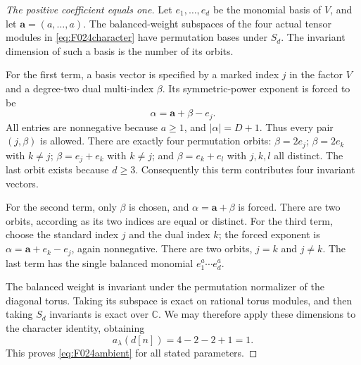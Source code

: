 \begin{proof}[The positive coefficient equals one]
Let \(e_1,\ldots,e_d\) be the monomial basis of \(V\),
and let \(\mathbf a=(a,\ldots,a)\). The balanced-weight
subspaces of the four actual tensor modules in
\eqref{eq:F024character} have permutation bases under \(S_d\).
The invariant dimension of such a basis is the number of
its orbits.

For the first term, a basis vector is specified by a marked
index \(j\) in the factor \(V\) and a degree-two dual
multi-index \(\beta\). Its symmetric-power exponent is
forced to be
\[
                           \alpha=\mathbf a+\beta-e_j.
\]
All entries are nonnegative because \(a\geq1\), and
\(|\alpha|=D+1\). Thus every pair \((j,\beta)\)
is allowed. There are exactly four permutation orbits:
\(\beta=2e_j\); \(\beta=2e_k\) with \(k\ne j\);
\(\beta=e_j+e_k\) with \(k\ne j\); and
\(\beta=e_k+e_l\) with \(j,k,l\) all distinct.
The last orbit exists because \(d\geq3\).
Consequently this term contributes four invariant vectors.

For the second term, only \(\beta\) is chosen, and
\(\alpha=\mathbf a+\beta\) is forced. There are two
orbits, according as its two indices are equal or distinct.
For the third term, choose the standard index \(j\) and
the dual index \(k\); the forced exponent is
\(\alpha=\mathbf a+e_k-e_j\), again nonnegative.
There are two orbits, \(j=k\) and \(j\ne k\).
The last term has the single balanced monomial
\(e_1^a\cdots e_d^a\).

The balanced weight is invariant under the permutation
normalizer of the diagonal torus. Taking its subspace is
exact on rational torus modules, and then taking \(S_d\)
invariants is exact over \(\mathbb C\). We may therefore
apply these dimensions to the character identity, obtaining
\[
                        a_\lambda(d[n])=4-2-2+1=1.
\]
This proves \eqref{eq:F024ambient} for all stated parameters.
\end{proof}

